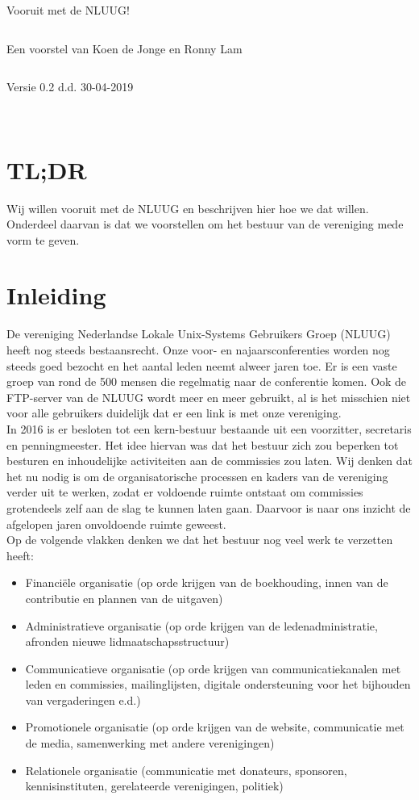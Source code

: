 \documentclass{article}
\begin{document}
\centerline{\Huge Vooruit met de NLUUG!}
$ $\\
\centerline{\Large Een voorstel van Koen de Jonge en Ronny Lam}
$ $\\
\centerline{Versie 0.2 d.d. 30-04-2019} \\


\section{TL;DR}
Wij willen vooruit met de NLUUG en beschrijven hier hoe we dat 
willen. Onderdeel daarvan is dat we voorstellen om het bestuur van de vereniging mede vorm te geven.

\section{Inleiding}
De vereniging Nederlandse Lokale Unix-Systems Gebruikers Groep (NLUUG) heeft nog steeds bestaansrecht. Onze voor- en najaarsconferenties worden nog steeds goed  bezocht en het aantal leden neemt alweer jaren toe. Er is een vaste groep van rond de 500 mensen die regelmatig naar de conferentie komen. Ook de FTP-server van de NLUUG wordt meer en meer gebruikt, al is het misschien niet voor alle gebruikers duidelijk dat er een link is met onze vereniging.\\

In 2016 is er besloten tot een kern-bestuur bestaande uit een voorzitter, secretaris en penningmeester. Het idee hiervan was dat het bestuur zich zou beperken tot besturen en inhoudelijke activiteiten aan de commissies zou laten. Wij denken dat het nu nodig is om de organisatorische processen en kaders van de vereniging verder uit te werken, zodat er voldoende ruimte ontstaat om commissies grotendeels zelf aan de slag te kunnen laten gaan. Daarvoor is naar ons inzicht de afgelopen jaren onvoldoende ruimte geweest.\\

Op de volgende vlakken denken we dat het bestuur nog veel werk te verzetten heeft:
\begin{itemize}
    \item Financi\"ele organisatie (op orde krijgen van de boekhouding, innen van de contributie en plannen van de uitgaven)
    \item Administratieve organisatie (op orde krijgen van de ledenadministratie, afronden nieuwe lidmaatschapsstructuur)
    \item  Communicatieve organisatie (op orde krijgen van communicatiekanalen met leden en commissies, mailinglijsten, digitale ondersteuning voor het bijhouden van vergaderingen e.d.)
    \item Promotionele organisatie (op orde krijgen van de website, communicatie met de media, samenwerking met andere verenigingen)
    \item  Relationele organisatie (communicatie met donateurs, sponsoren, kennisinstituten, gerelateerde verenigingen, politiek)
\end{itemize}
\end{document}
